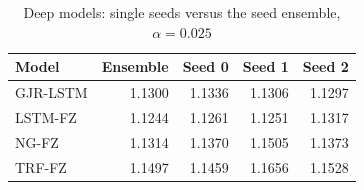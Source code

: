 \begin{table}[htbp]
\centering
\footnotesize
\caption{Deep models: single seeds versus the seed ensemble, $\alpha=0.025$}
\label{tab:seeds}
\begin{tabular}{lrrrr}
\toprule
Model & Ensemble & Seed 0 & Seed 1 & Seed 2 \\
\midrule
GJR-LSTM & 1.1300 & 1.1336 & 1.1306 & 1.1297 \\
LSTM-FZ & 1.1244 & 1.1261 & 1.1251 & 1.1317 \\
NG-FZ & 1.1314 & 1.1370 & 1.1505 & 1.1373 \\
TRF-FZ & 1.1497 & 1.1459 & 1.1656 & 1.1528 \\
\bottomrule
\end{tabular}
\end{table}